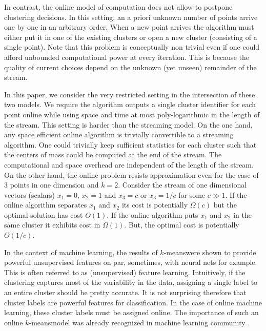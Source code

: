 \documentclass[11pt,twoside]{article}
\newcommand{\kmeans}{$k$-means}
\begin{document}
In contrast, the online model of computation does not allow to postpone clustering decisions. 
In this setting, an a priori unknown number of points arrive one by one in an arbitrary order.
When a new point arrives the algorithm must either put it in one of the existing clusters or open a new cluster (consisting of a single point). 
Note that this problem is conceptually non trivial even if one could afford unbounded computational power at every iteration.
This is because the quality of current choices depend on the unknown (yet unseen) remainder of the stream.

In this paper, we consider the very restricted setting in the intersection of these two models.
We require the algorithm outputs a single cluster identifier for each point online while using space and time at most poly-logarithmic in the length of the stream.
This setting is harder than the streaming model. 
On the one hand, any space efficient online algorithm is trivially convertible to a streaming algorithm.
One could trivially keep sufficient statistics for each cluster such that the centers of mass could be computed at the end of the stream.
The computational and space overhead are independent of the length of the stream.
On the other hand, the online problem resists approximation even for the case of $3$ points in one dimension and $k=2$.
Consider the stream of one dimensional vectors (scalars) $x_1 = 0$, $x_2 = 1$ and $x_3 = c$ or $x_3 = 1/c$ for some $c \gg 1$.
If the online algorithm separates $x_1$ and $x_2$ its cost is potentially $\Omega(c)$ but the optimal solution has cost $O(1)$. 
If the online algorithm puts $x_1$ and $x_2$ in the same cluster it exhibits cost in $\Omega(1)$. But, the optimal cost is potentially $O(1/c)$. 



In the context of machine learning, the results of \kmeans were shown to provide powerful unsupervised features \cite{CoatesNL11} on par, sometimes, with neural nets for example.
This is often referred to as (unsupervised) feature learning.
Intuitively, if the clustering captures most of the variability in the data, assigning a single label to an entire cluster should be pretty accurate.
It is not surprising therefore that cluster labels are powerful features for classification. 
In the case of online machine learning, these cluster labels must be assigned online.
The importance of such an online \kmeans model was already recognized in machine learning community \cite{ChoromanskaM12, DasguptaCSE291}.  
\end{document}
